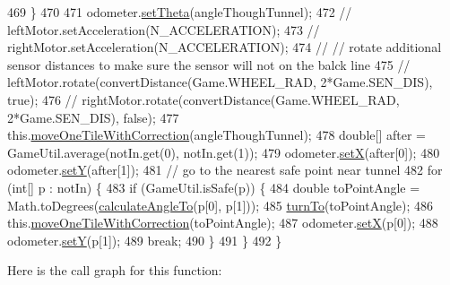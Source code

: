 \begin{DoxyCode}
469     \}
470 
471     odometer.\hyperlink{classca_1_1mcgill_1_1ecse211_1_1odometer_1_1_odometer_data_a419b8f07c2c5374411c8e62298e9a402}{setTheta}(angleThoughTunnel);
472     \textcolor{comment}{// leftMotor.setAcceleration(N\_ACCELERATION);}
473     \textcolor{comment}{// rightMotor.setAcceleration(N\_ACCELERATION);}
474     \textcolor{comment}{// // rotate additional sensor distances to make sure the sensor will not on the balck line}
475     \textcolor{comment}{// leftMotor.rotate(convertDistance(Game.WHEEL\_RAD, 2*Game.SEN\_DIS), true);}
476     \textcolor{comment}{// rightMotor.rotate(convertDistance(Game.WHEEL\_RAD, 2*Game.SEN\_DIS), false);}
477     this.\hyperlink{classca_1_1mcgill_1_1ecse211_1_1project_1_1_navigation_afbe677941e2bd44e35452e1eff508ae9}{moveOneTileWithCorrection}(angleThoughTunnel);
478     \textcolor{keywordtype}{double}[] after = GameUtil.average(notIn.get(0), notIn.get(1));
479     odometer.\hyperlink{classca_1_1mcgill_1_1ecse211_1_1odometer_1_1_odometer_data_a2911d7215e47f3064defe016b46bfeef}{setX}(after[0]);
480     odometer.\hyperlink{classca_1_1mcgill_1_1ecse211_1_1odometer_1_1_odometer_data_a82986438cd462e66520bc62bb4bd2b75}{setY}(after[1]);
481     \textcolor{comment}{// go to the nearest safe point near tunnel}
482     \textcolor{keywordflow}{for} (\textcolor{keywordtype}{int}[] p : notIn) \{
483       \textcolor{keywordflow}{if} (GameUtil.isSafe(p)) \{
484         \textcolor{keywordtype}{double} toPointAngle = Math.toDegrees(\hyperlink{classca_1_1mcgill_1_1ecse211_1_1project_1_1_navigation_a4376e54162df8f123ca3b52e4fd2f38d}{calculateAngleTo}(p[0], p[1]));
485         \hyperlink{classca_1_1mcgill_1_1ecse211_1_1project_1_1_navigation_a3bbe0645f2b3b3d0986b4a707fb5a00c}{turnTo}(toPointAngle);
486         this.\hyperlink{classca_1_1mcgill_1_1ecse211_1_1project_1_1_navigation_afbe677941e2bd44e35452e1eff508ae9}{moveOneTileWithCorrection}(toPointAngle);
487         odometer.\hyperlink{classca_1_1mcgill_1_1ecse211_1_1odometer_1_1_odometer_data_a2911d7215e47f3064defe016b46bfeef}{setX}(p[0]);
488         odometer.\hyperlink{classca_1_1mcgill_1_1ecse211_1_1odometer_1_1_odometer_data_a82986438cd462e66520bc62bb4bd2b75}{setY}(p[1]);
489         \textcolor{keywordflow}{break};
490       \}
491     \}
492   \}
\end{DoxyCode}
Here is the call graph for this function\+:\nopagebreak
